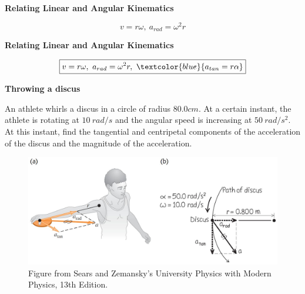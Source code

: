 \documentclass[]{beamer}
\begin{document}

\begin{frame}
    \textbf{Relating Linear and Angular Kinematics}   
    \vspace{5mm}
  
\begin{equation*}
    \boxed{v=r\omega, \ a_{rad}=\omega^ 2r}  
\end{equation*}
    
         \end{frame}
    



  \begin{frame}
    \textbf{Relating Linear and Angular Kinematics}   
    \vspace{5mm}
  
\begin{equation*}
    \boxed { v=r\omega, \ a_{rad}=\omega^ 2r, \ \textcolor{blue}{ a_{tan}=r\alpha}}
\end{equation*}
    
         \end{frame}
    


  \begin{frame}
    \textbf{Throwing a discus}   
    \vspace{5mm}
  
    An athlete whirls a discus in a circle of radius $80.0 cm$. At a certain
    instant, the athlete is rotating at $10~rad/s$ and the angular speed
    is increasing at $50~rad/s^2$. At this instant, find the tangential and
    centripetal components of the acceleration of the discus and the
    magnitude of the acceleration.
    



    \vspace{5mm}

    \begin{figure}[h!]  
      \includegraphics[width=1.0\textwidth]{images/17.jpg}
      \caption{ {\tiny Figure from Sears and Zemansky's University Physics 
      with Modern Physics, 13th Edition.} }
    \end{figure}




         \end{frame}
    
\end{document}
